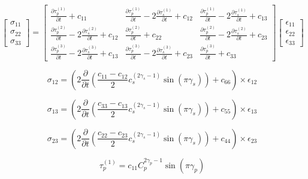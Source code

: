 \documentclass{paris17}
\begin{document}
\begin{equation}
\begin{bmatrix} \sigma_{11}\\ \sigma_{22}\\ \sigma_{33} \end{bmatrix} = \begin{bmatrix} \frac{\partial \tau_p^{(1)}}{\partial t} + c_{11} & \frac{\partial \tau_p^{(1)}}{\partial t} - 2\frac{\partial \tau_s^{(1)}}{\partial t} +c_{12}& \frac{\partial \tau_p^{(1)}}{\partial t} - 2\frac{\partial \tau_s^{(1)}}{\partial t} +c_{13} \\ \frac{\partial \tau_p^{(2)}}{\partial t} - 2\frac{\partial \tau_s^{(2)}}{\partial t} +c_{12}& \frac{\partial \tau_p^{(2)}}{\partial t} + c_{22} & \frac{\partial \tau_p^{(2)}}{\partial t} - 2\frac{\partial \tau_s^{(2)}}{\partial t} +c_{23}\\ \frac{\partial \tau_p^{(3)}}{\partial t} - 2\frac{\partial \tau_s^{(3)}}{\partial t} +c_{13} & \frac{\partial \tau_p^{(3)}}{\partial t} - 2\frac{\partial \tau_s^{(3)}}{\partial t} +c_{23} & \frac{\partial \tau_p^{(3)}}{\partial t} + c_{33} \end{bmatrix} \begin{bmatrix} \epsilon_{11}\\ \epsilon_{22}\\ \epsilon_{33} \end{bmatrix}
\end{equation}

\begin{equation}
  \sigma_{12} = \left ( 2\frac{\partial}{\partial t} \left( \frac{c_{11}-c_{12}}{2}c_s^{(2\gamma_s-1)}\sin(\pi\gamma_s) \right) + c_{66} \right )\times \epsilon_{12}
\end{equation}

\begin{equation}
  \sigma_{13} = \left ( 2\frac{\partial}{\partial t} \left( \frac{c_{33}-c_{13}}{2}c_s^{(2\gamma_s-1)}\sin(\pi\gamma_s) \right) + c_{55} \right )\times \epsilon_{13}
\end{equation}

\begin{equation}
  \sigma_{23} = \left ( 2\frac{\partial}{\partial t} \left( \frac{c_{22}-c_{23}}{2}c_s^{(2\gamma_s-1)}\sin(\pi\gamma_s) \right) + c_{44} \right )\times \epsilon_{23}
\end{equation}

\begin{equation}
  \tau_p^{(1)} = c_{11}C_p^{2\gamma_p - 1}\sin(\pi \gamma_p)
\end{equation}
\end{document}
